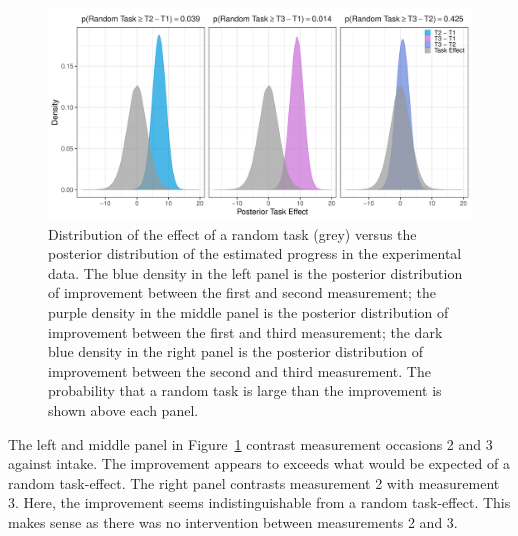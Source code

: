 \documentclass[a4paper]{article}
\begin{document}
\begin{figure}[!ht]
	\centering
	\includegraphics[width=\textwidth]{compareTaskEffects.pdf}
	\caption{Distribution of the effect of a random task (grey) versus the posterior distribution of the estimated progress in the experimental data. The blue density in the left panel is the posterior distribution of improvement between the first and second measurement; the purple density in the middle panel is the posterior distribution of improvement between the first and third measurement; the dark blue density in the right panel is the posterior distribution of improvement between the second and third measurement. The probability that a random task is large than the improvement is shown above each panel.}
	\label{fig:posteriorImprovement}
\end{figure}

The left and middle panel in Figure~\ref{fig:posteriorImprovement} contrast measurement occasions 2 and 3 against intake.
The improvement appears to exceeds what would be expected of a random task-effect.
The right panel contrasts measurement 2 with measurement 3. Here, the improvement seems indistinguishable from a random task-effect.
This makes sense as there was no intervention between measurements 2 and 3.
\end{document}
